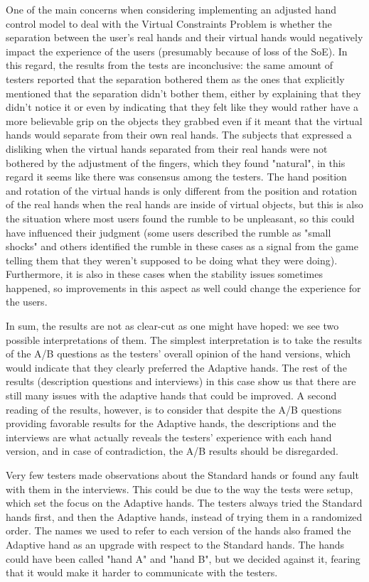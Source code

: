 One of the main concerns when considering implementing an adjusted hand control model to deal with the Virtual Constraints Problem is whether the separation between the user's real hands and their virtual hands would negatively impact the experience of the users (presumably because of loss of the SoE). In this regard, the results from the tests are inconclusive: the same amount of testers reported that the separation bothered them as the ones that explicitly mentioned that the separation didn't bother them, either by explaining that they didn't notice it or even by indicating that they felt like they would rather have a more believable grip on the objects they grabbed even if it meant that the virtual hands would separate from their own real hands. The subjects that expressed a disliking when the virtual hands separated from their real hands were not bothered by the adjustment of the fingers, which they found "natural", in this regard it seems like there was consensus among the testers. The hand position and rotation of the virtual hands is only different from the position and rotation of the real hands when the real hands are inside of virtual objects, but this is also the situation where most users found the rumble to be unpleasant, so this could have influenced their judgment (some users described the rumble as "small shocks" and others identified the rumble in these cases as a signal from the game telling them that they weren't supposed to be doing what they were doing). Furthermore, it is also in these cases when the stability issues sometimes happened, so improvements in this aspect as well could change the experience for the users. 

In sum, the results are not as clear-cut as one might have hoped: we see two possible interpretations of them. The simplest interpretation is to take the results of the A/B questions as the testers' overall opinion of the hand versions, which would indicate that they clearly preferred the Adaptive hands. The rest of the results (description questions and interviews) in this case show us that there are still many issues with the adaptive hands that could be improved. A second reading of the results, however, is to consider that despite the A/B questions providing favorable results for the Adaptive hands, the descriptions and the interviews are what actually reveals the testers' experience with each hand version, and in case of contradiction, the A/B results should be disregarded. 

Very few testers made observations about the Standard hands or found any fault with them in the interviews. This could be due to the way the tests were setup, which set the focus on the Adaptive hands. The testers always tried the Standard hands first, and then the Adaptive hands, instead of trying them in a randomized order. The names we used to refer to each version of the hands also framed the Adaptive hand as an upgrade with respect to the Standard hands. The hands could have been called "hand A" and "hand B", but we decided against it, fearing that it would make it harder to communicate with the testers.

